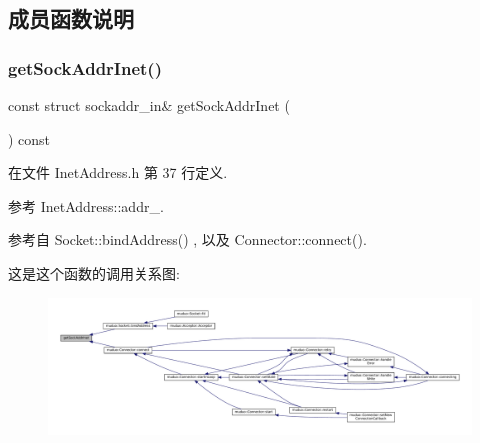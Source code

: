 \subsection{成员函数说明}
\mbox{\label{classmuduo_1_1InetAddress_a1878fa474832ba9fa73958124c0404cc}} 
\subsubsection{\texorpdfstring{get\+Sock\+Addr\+Inet()}{getSockAddrInet()}}
{\footnotesize\ttfamily const struct sockaddr\+\_\+in\& get\+Sock\+Addr\+Inet (\begin{DoxyParamCaption}{ }\end{DoxyParamCaption}) const\hspace{0.3cm}{\ttfamily [inline]}}



在文件 Inet\+Address.\+h 第 37 行定义.



参考 Inet\+Address\+::addr\+\_\+.



参考自 Socket\+::bind\+Address() , 以及 Connector\+::connect().

这是这个函数的调用关系图\+:
\nopagebreak
\begin{figure}[H]
\begin{center}
\leavevmode
\includegraphics[width=350pt]{classmuduo_1_1InetAddress_a1878fa474832ba9fa73958124c0404cc_icgraph}
\end{center}
\end{figure}
\mbox{\label{classmuduo_1_1InetAddress_ac40372dd403192210eddb5e699a420c7}} 
